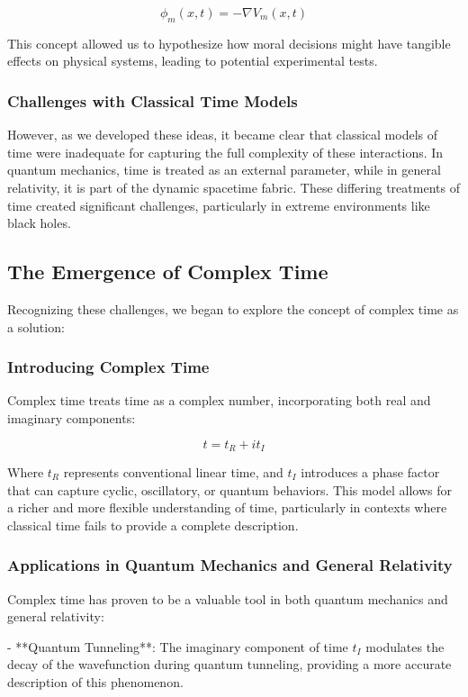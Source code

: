 \documentclass{article}
\begin{document}
\[
\phi_m(x, t) = -\nabla V_m(x, t)
\]

This concept allowed us to hypothesize how moral decisions might have tangible effects on physical systems, leading to potential experimental tests.

\subsubsection{Challenges with Classical Time Models}

However, as we developed these ideas, it became clear that classical models of time were inadequate for capturing the full complexity of these interactions. In quantum mechanics, time is treated as an external parameter, while in general relativity, it is part of the dynamic spacetime fabric. These differing treatments of time created significant challenges, particularly in extreme environments like black holes.

\subsection{The Emergence of Complex Time}

Recognizing these challenges, we began to explore the concept of complex time as a solution:

\subsubsection{Introducing Complex Time}

Complex time treats time as a complex number, incorporating both real and imaginary components:

\[
t = t_R + i t_I
\]

Where \( t_R \) represents conventional linear time, and \( t_I \) introduces a phase factor that can capture cyclic, oscillatory, or quantum behaviors. This model allows for a richer and more flexible understanding of time, particularly in contexts where classical time fails to provide a complete description.

\subsubsection{Applications in Quantum Mechanics and General Relativity}

Complex time has proven to be a valuable tool in both quantum mechanics and general relativity:

- **Quantum Tunneling**: The imaginary component of time \( t_I \) modulates the decay of the wavefunction during quantum tunneling, providing a more accurate description of this phenomenon.
  
\end{document}
